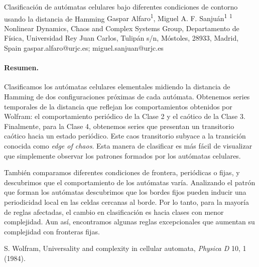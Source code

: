\documentclass[11pt,a4paper]{article}
\begin{document}
\begin{sincabstract}
{Clasificación de autómatas celulares bajo diferentes condiciones de contorno usando la distancia de Hamming}
{Gaspar Alfaro\textsuperscript{1}, Miguel A. F. Sanjuán\textsuperscript{1}}
{\textsuperscript{1} Nonlinear Dynamics, Chaos and Complex Systems Group, Departamento de Física, Universidad Rey Juan Carlos, Tulipán s/n, Móstoles, 28933, Madrid, Spain}
{gaspar.alfaro@urjc.es; miguel.sanjuan@urjc.es}

\paragraph{Resumen.}
Clasificamos los autómatas celulares elementales midiendo la distancia de Hamming de dos configuraciones próximas de cada autómata. Obtenemos series temporales de la distancia que reflejan los comportamientos obtenidos por Wolfram: el comportamiento periódico de la Clase 2 y el caótico de la Clase 3. Finalmente, para la Clase 4, obtenemos series que presentan un transitorio caótico hacia un estado periódico. Este caos transitorio subyace a la transición conocida como \textit{edge of chaos}. Esta manera de clasificar es más fácil de visualizar que simplemente observar los patrones formados por los autómatas celulares.

También comparamos diferentes condiciones de frontera, periódicas o fijas, y descubrimos que el comportamiento de los autómatas varía. Analizando el patrón que forman los autómatas descubrimos que los bordes fijos pueden inducir una periodicidad local en las celdas cercanas al borde. Por lo tanto, para la mayoría de reglas afectadas, el cambio en clasificación es hacia clases con menor complejidad. Aun así, encontramos algunas reglas excepcionales que aumentan su complejidad con fronteras fijas.


\begin{enumerate}[label={[\arabic*]},leftmargin=*]
\item S. Wolfram, Universality and complexity in cellular automata, \textit{Physica D} 10, 1 (1984).
\end{enumerate}
\end{sincabstract}

\end{document}
